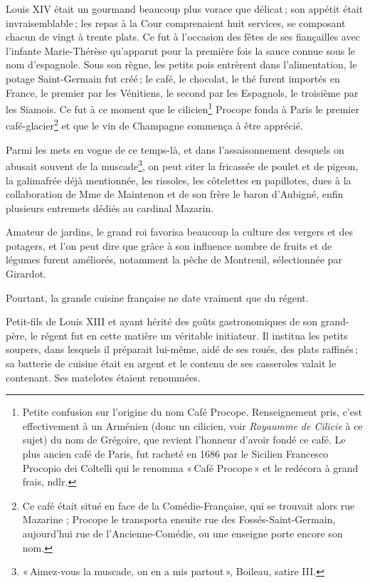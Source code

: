 Louis XIV était un gourmand beaucoup plus vorace que délicat ; son appétit
était invraisemblable ; les repas à la Cour comprenaient huit services, se
composant chacun de vingt à trente plats. Ce fut à l'occasion des fêtes de ses
fiançailles avec l'infante Marie-Thérèse qu'apparut pour la première fois la
sauce connue sous le nom d’espagnole. Sous son règne, les petits pois entrèrent
dans l'alimentation, le potage Saint-Germain fut créé ; le café, le chocolat,
le thé furent importés en France, le premier par les Vénitiens, le second par
les Espagnols, le troisième par les Siamois. Ce fut à ce moment que le
cilicien\footnote{Petite confusion sur l'origine du nom Café
Procope. Renseignement pris, c'est effectivement à un Arménien (donc un
cilicien, voir \textit{Royaumme de Cilicie} à ce sujet) du nom de Grégoire, que
revient l'honneur d'avoir fondé ce café. Le plus ancien café de Paris, fut
racheté en 1686 par le Sicilien Francesco Procopio dei Coltelli qui le renomma
« Café Procope » et le redécora à grand frais, ndlr.} Procope fonda à Paris le
premier café-glacier\footnote{Ce café était situé en face de la
Comédie-Française, qui se trouvait alors rue Mazarine ; Procope le transporta
ensuite rue des Fossés-Saint-Germain, aujourd'hui rue de l’Ancienne-Comédie, ou
une enseigne porte encore son nom.} et que le vin de Champagne commença à être
apprécié.

Parmi les mets en vogue de ce temps-là, et dans l’assaisonnement desquels on
abusait souvent de la muscade\footnote{« Aimez-vous la muscade, on en a mis
partout », Boileau, satire III.}, on peut citer la fricassée de poulet et de
pigeon, la galimafrée déjà mentionnée, les rissoles, les côtelettes en
papillotes, dues à la collaboration de Mme de Maintenon et de son frère le
baron d'Aubigné, enfin plusieurs entremets dédiés au cardinal Mazarin.

Amateur de jardins, le grand roi favorisa beaucoup la culture des vergers et
des potagers, et l’on peut dire que grâce à son influence nombre de fruits et
de légumes furent améliorés, notamment la pêche de Montreuil, sélectionnée par
Girardot.

Pourtant, la grande cuisine française ne date vraiment que du régent.

Petit-fils de Louis XIII et ayant hérité des goûts gastronomiques de son
grand-père, le régent fut en cette matière un véritable initiateur. Il institua
les petits soupers, dans lesquels il préparait lui-même, aidé de ses roués, des
plats raffinés ; sa batterie de cuisine était en argent et le contenu de ses
casseroles valait le contenant. Ses matelotes étaient renommées.

